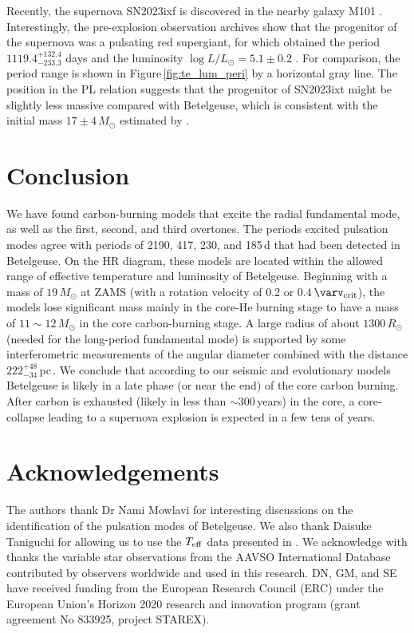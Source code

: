 \documentclass[fleqn,usenatbib]{mnras}
\begin{document}
Recently, the supernova SN2023ixf is discovered in the nearby galaxy M101 \citep{Itagaki2023}. Interestingly, the pre-explosion observation archives show that the progenitor of the supernova was a pulsating red supergiant, for which \citet{Jencson2023} obtained the period $1119.4^{+132.4}_{-233.3}$ days and the luminosity $\log L/L_\odot = 5.1\pm 0.2$ \citep[similar period and luminosity were also obtained by][]{Soraisam2023}. For comparison, the period range is shown in Figure\,\ref{fig:te_lum_peri} by a horizontal gray line. The position in the PL relation suggests that the progenitor of SN2023ixt might be slightly less massive compared with Betelgeuse, which is consistent with the initial mass $17\pm4\,M_\odot$ estimated by \citet{Jencson2023}.    



\section{Conclusion}
We have found carbon-burning models that excite the radial fundamental mode, 
as well as the first, second, and third overtones. 
The periods excited pulsation modes agree with 
periods of 2190, 417, 230, and 185\,d that had been detected in Betelgeuse.  
On the HR diagram, these models are located within the allowed range of 
effective temperature and luminosity of Betelgeuse.
Beginning with a mass of $19\,M_\odot$ at ZAMS 
(with a rotation velocity of 0.2 or 0.4\,$\varv_{\rm crit}$),  
the models lose significant mass mainly in the core-He burning stage 
to have a mass of $11\sim12\,M_\odot$ in the core carbon-burning stage.  
A large radius of about $1300\,R_\odot$ 
(needed for the long-period fundamental mode) is supported
by some interferometric measurements of the angular diameter 
combined with the distance $222^{+48}_{-34}$\,pc\,\citep{Harper2017}.
We conclude that according to our seismic and evolutionary models
Betelgeuse is likely in a late phase (or near the end) of the core carbon burning.
After carbon is exhausted (likely in less than $\sim300$\,years) in the core, a core-collapse leading to a supernova explosion is expected in a few tens of years.

\section*{Acknowledgements}
The authors thank Dr Nami Mowlavi for interesting discussions 
on the identification of the pulsation modes of Betelgeuse.
We also thank Daisuke Taniguchi for allowing us to use the 
$T_{\rm eff}$ data presented in \citet{Taniguchi2022}. 
We acknowledge with thanks the variable star observations from the AAVSO International Database contributed by observers worldwide and used in this research.
DN, GM, and SE have received funding from the European Research Council (ERC) 
under the European Union's Horizon 2020 research and innovation program 
(grant agreement No 833925, project STAREX).
\end{document}
